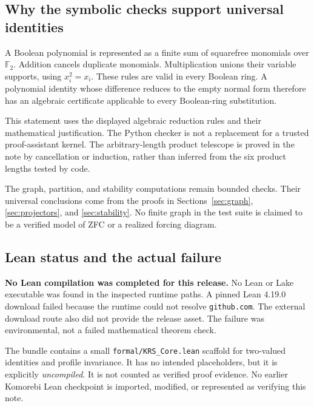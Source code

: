 \documentclass[11pt,letterpaper]{article}
\theoremstyle{definition}
\newcommand{\F}{\mathbb F_2}
\begin{document}
\subsection{Why the symbolic checks support universal identities}
A Boolean polynomial is represented as a finite sum of squarefree monomials over $\F$. Addition cancels duplicate monomials. Multiplication unions their variable supports, using $x_i^2=x_i$. These rules are valid in every Boolean ring. A polynomial identity whose difference reduces to the empty normal form therefore has an algebraic certificate applicable to every Boolean-ring substitution.

This statement uses the displayed algebraic reduction rules and their mathematical justification. The Python checker is not a replacement for a trusted proof-assistant kernel. The arbitrary-length product telescope is proved in the note by cancellation or induction, rather than inferred from the six product lengths tested by code.

The graph, partition, and stability computations remain bounded checks. Their universal conclusions come from the proofs in Sections~\ref{sec:graph}, \ref{sec:projectors}, and \ref{sec:stability}. No finite graph in the test suite is claimed to be a verified model of ZFC or a realized forcing diagram.

\subsection{Lean status and the actual failure}
\textbf{No Lean compilation was completed for this release.} No Lean or Lake executable was found in the inspected runtime paths. A pinned Lean 4.19.0 download failed because the runtime could not resolve \texttt{github.com}. The external download route also did not provide the release asset. The failure was environmental, not a failed mathematical theorem check.

The bundle contains a small \texttt{formal/KRS\_Core.lean} scaffold for two-valued identities and profile invariance. It has no intended placeholders, but it is explicitly \emph{uncompiled}. It is not counted as verified proof evidence. No earlier Komorebi Lean checkpoint is imported, modified, or represented as verifying this note.
\end{document}
